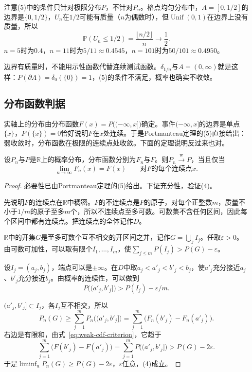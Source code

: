 注意(5)中的条件只针对极限分布$P$，不针对$P_n$。格点均匀分布中，$A=[0,1/2]$的边界是$\{0,1/2\}$，$U_n$在$1/2$可能有质量（$n$为偶数时），但$\operatorname{Unif}(0,1)$在边界上没有质量，所以
\[
 \mathbb{P}(U_n\leq1/2)=\frac{\lfloor n/2\rfloor}{n}\longrightarrow\frac12 .
\]
$n=5$时为$0.4$，$n=11$时为$5/11\approx0.4545$，$n=101$时为$50/101\approx0.4950$。

边界有质量时，不能用示性函数代替连续测试函数。$\delta_{1/n}$与$A=(0,\infty)$就是这样：$P(\partial A)=\delta_0(\{0\})=1$，(5)的条件不满足，概率也确实不收敛。

\subsection{分布函数判据}
\label{sec:weak-cdf-criterion}

实轴上的分布由分布函数$F(x)=P\bigl((-\infty,x]\bigr)$确定。事件$(-\infty,x]$的边界是单点$\{x\}$，$P(\{x\})=0$恰好说明$F$在$x$处连续。于是Portmanteau定理的(5)直接给出：弱收敛时，分布函数在极限的连续点处收敛。下面的定理说明反过来也对。

\begin{theorem}[分布函数判据]
\label{thm:weak-cdf-criterion}
设$P_n$与$P$是$\mathbb{R}$上的概率分布，分布函数分别为$F_n$与$F$。则$P_n\xrightarrow{\mathrm{w}}P$，当且仅当
\begin{equation}
 \lim_{n\to\infty}F_n(x)=F(x)\qquad\text{对}F\text{的每个连续点}x .
 \label{eq:weak-cdf-criterion}
\end{equation}
\end{theorem}

\begin{proof}
必要性已由Portmanteau定理的(5)给出。下证充分性，验证(4)。

先说明$F$的连续点在$\mathbb{R}$中稠密。$F$的不连续点是$P$的原子，对每个正整数$m$，质量不小于$1/m$的原子至多$m$个，所以不连续点至多可数。可数集不含任何区间，因此每个区间中都有连续点。把连续点的全体记作$D$。

$\mathbb{R}$中的开集$G$是至多可数个互不相交的开区间之并，记作$G=\bigcup_jI_j$。任取$\varepsilon>0$。由可数可加性，可以取有限个$I_1,\dots,I_m$，使$\sum_{j\leq m}P(I_j)>P(G)-\varepsilon$。

设$I_j=(a_j,b_j)$，端点可以是$\pm\infty$。在$D$中取$a_j<a'_j<b'_j<b_j$，使$a'_j$充分接近$a_j$、$b'_j$充分接近$b_j$。由概率的连续性，可以做到
\[
 P\bigl((a'_j,b'_j]\bigr)>P(I_j)-\varepsilon/m .
\]

$(a'_j,b'_j]\subset I_j$，各$I_j$互不相交，所以
\[
 P_n(G)\geq\sum_{j=1}^{m}P_n\bigl((a'_j,b'_j]\bigr)=\sum_{j=1}^{m}\bigl(F_n(b'_j)-F_n(a'_j)\bigr) .
\]
右边是有限和，由式~\eqref{eq:weak-cdf-criterion}，它趋于
\[
 \sum_{j=1}^{m}\bigl(F(b'_j)-F(a'_j)\bigr)=\sum_{j=1}^{m}P\bigl((a'_j,b'_j]\bigr)>P(G)-2\varepsilon .
\]
于是$\liminf_nP_n(G)\geq P(G)-2\varepsilon$，$\varepsilon$任意，(4)成立。
\end{proof}

